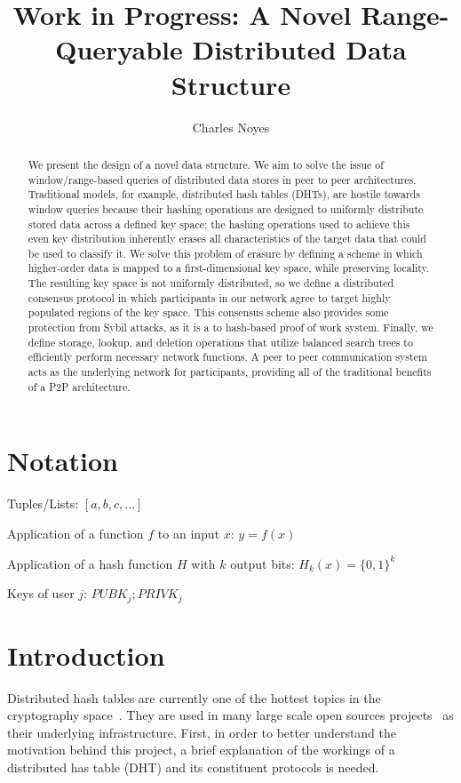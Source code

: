 \documentclass[10pt]{IEEEtran}
\title{Work in Progress: A Novel Range-Queryable Distributed Data Structure}
\author{Charles Noyes}
\date{\vspace{-5ex}}
\begin{document}
\maketitle

\begin{abstract}
We present the design of a novel data structure. We aim to solve the issue of window/range-based queries of distributed data stores in peer to peer architectures. Traditional models, for example, distributed hash tables (DHTs), are hostile towards window queries because their hashing operations are designed to uniformly distribute stored data across a defined key space; the hashing operations used to achieve this even key distribution inherently erases all characteristics of the target data that could be used to classify it. We solve this problem of erasure by defining a scheme in which higher-order data is mapped to a first-dimensional key space, while preserving locality. The resulting key space is not uniformly distributed, so we define a distributed consensus protocol in which participants in our network agree to target highly populated regions of the key space. This consensus scheme also provides some protection from Sybil attacks, as it is a to hash-based proof of work system. Finally, we define storage, lookup, and deletion operations that utilize balanced search trees to efficiently perform necessary network functions. A peer to peer communication system acts as the underlying network for participants, providing all of the traditional benefits of a P2P architecture.
\end{abstract}


\section{Notation}

\noindent Tuples/Lists: $[a,b,c,...]$

\noindent Application of a function $f$ to an input $x$: $y=f(x)$

\noindent Application of a hash function $H$ with $k$ output bits: $H_{k}(x) = \{0,1\}^k$

\noindent Keys of user $j$: $ PUBK_j; PRIVK_j $

 
\section{Introduction}
\par Distributed hash tables are currently one of the hottest topics in the cryptography space~\cite{Stoica:2001dj,Rowstron:2001ea,Ratnasamy:2001wn}. They are used in many large scale open sources projects~\cite{Freitas:2013tb,Xu:2010vs,Perfitt:2010fh} as their underlying infrastructure. First, in order to better understand the motivation behind this project, a brief explanation of the workings of a distributed has table (DHT) and its constituent protocols is needed.
\end{document}
